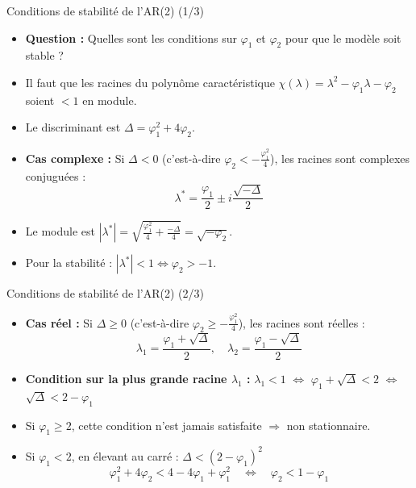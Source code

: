 \documentclass[11pt,aspectratio=169]{beamer}
\begin{document}
\begin{frame}{Conditions de stabilité de l'AR(2) (1/3)}

\begin{itemize}

\item \textbf{Question :} Quelles sont les conditions sur $\varphi_1$ et $\varphi_2$ pour que le modèle soit stable ?\newline

\item Il faut que les racines du polynôme caractéristique $\chi(\lambda) = \lambda^2 - \varphi_1 \lambda - \varphi_2$ soient $< 1$ en module.\newline

\item Le discriminant est $\Delta = \varphi_1^2 + 4\varphi_2$.\newline

\item \textbf{Cas complexe :} Si $\Delta < 0$ (c'est-à-dire $\varphi_2 < -\frac{\varphi_1^2}{4}$), les racines sont complexes conjuguées :
\[
\lambda^* = \frac{\varphi_1}{2} \pm i \frac{\sqrt{-\Delta}}{2}
\]

\item Le module est $|\lambda^*| = \sqrt{\frac{\varphi_1^2}{4} + \frac{-\Delta}{4}} = \sqrt{-\varphi_2}$.\newline

\item Pour la stabilité : $|\lambda^*| < 1 \Leftrightarrow \boxed{\varphi_2 > -1}$.

\end{itemize}
\end{frame}

\begin{frame}{Conditions de stabilité de l'AR(2) (2/3)}

\begin{itemize}

\item \textbf{Cas réel :} Si $\Delta \geq 0$ (c'est-à-dire $\varphi_2 \geq -\frac{\varphi_1^2}{4}$), les racines sont réelles :
\[
\lambda_1 = \frac{\varphi_1 + \sqrt{\Delta}}{2}, \quad \lambda_2 = \frac{\varphi_1 - \sqrt{\Delta}}{2}
\]

\item \textbf{Condition sur la plus grande racine $\lambda_1$ :}
$\lambda_1 < 1$ $\Leftrightarrow$ $\varphi_1 + \sqrt{\Delta} < 2$ $\Leftrightarrow$ $\sqrt{\Delta} < 2 - \varphi_1$\newline

\item Si $\varphi_1 \geq 2$, cette condition n'est jamais satisfaite $\Rightarrow$ non stationnaire.\newline

\item Si $\varphi_1 < 2$, en élevant au carré : $\Delta < (2 - \varphi_1)^2$
\[
\varphi_1^2 + 4\varphi_2 < 4 - 4\varphi_1 + \varphi_1^2 \quad \Leftrightarrow \quad \boxed{\varphi_2 < 1 - \varphi_1}
\]

\end{itemize}
\end{frame}
\end{document}
